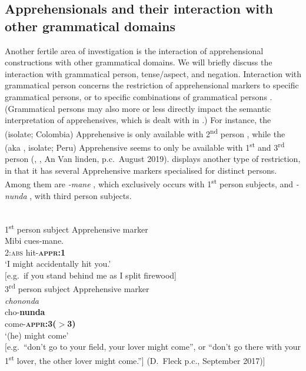 \documentclass[output=paper,colorlinks,citecolor=brown]{langscibook}
\begin{document}
\subsection{Apprehensionals and their interaction with other grammatical domains}
\label{subsec:othergramm}

Another fertile area of investigation is the interaction of apprehensional constructions with other grammatical domains. We will briefly discuss the interaction with grammatical person, tense/aspect, and negation. Interaction with grammatical person concerns the restriction of apprehensional markers to specific grammatical persons, or to specific combinations of grammatical persons \citep{vuillermet2018b}. (Grammatical persons may also more or less directly impact the semantic interpretation of  apprehensives, which is dealt with in .) For instance, the  (isolate; Colombia) Apprehensive is only available with 2\textsuperscript{nd} person \citep[89]{landaburu1979}, while the  (aka , isolate; Peru) Apprehensive seems to only be available with 1\textsuperscript{st} and 3\textsuperscript{rd} person (\cite[240]{helbergchavez1989}, \cite[222]{tripp1995}, An Van linden, p.c.\  August 2019).  displays another type of restriction, in that it has several Apprehensive markers specialised for distinct persons. Among them are \textit{-mane} , which exclusively occurs with 1\textsuperscript{st} person subjects, and \textit{-nunda} , with third person subjects.


\ea \label{ex:intro11} 
\\
\ea \label{ex:intro11a} \textnormal{1\textsuperscript{st} person subject Apprehensive marker} \\
\gll Mibi 	cues-mane. \\
2:\textsc{abs} hit-\textsc{\textbf{appr:1}} \\
\glt `I might accidentally hit you.' \\
$[$e.g.\  if you stand behind me as I split firewood] \\
\ex \label{ex:intro11b} \textnormal{3\textsuperscript{rd} person subject Apprehensive marker} \\
\textit{chononda} \\
\gll cho-\textbf{nunda} \\
come-\textsc{\textbf{appr:3($>$3)}} \\
\glt `(he) might come' \\
$[$e.g.\ ``don't go to your field, your lover might come'', or ``don't go there with your 1\textsuperscript{st} lover, the other lover might come.''] (D.\ Fleck p.c., September 2017)]
\z
\z
\end{document}
